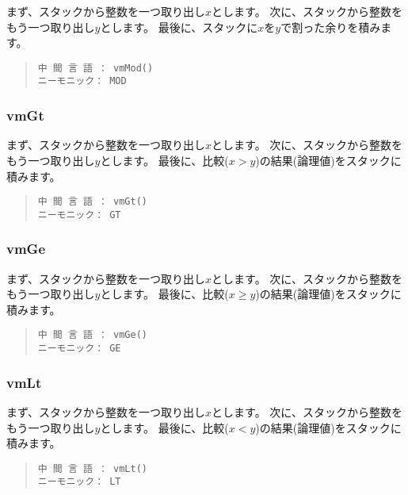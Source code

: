 まず、スタックから整数を一つ取り出し$x$とします。
次に、スタックから整数をもう一つ取り出し$y$とします。
最後に、スタックに$x$を$y$で割った余りを積みます。

\begin{quote}
\begin{verbatim}
中 間 言 語 ： vmMod()
ニーモニック： MOD
\end{verbatim}
\end{quote}

\subsubsection{vmGt}

まず、スタックから整数を一つ取り出し$x$とします。
次に、スタックから整数をもう一つ取り出し$y$とします。
最後に、比較($x > y$)の結果(論理値)をスタックに積みます。

\begin{quote}
\begin{verbatim}
中 間 言 語 ： vmGt()
ニーモニック： GT
\end{verbatim}
\end{quote}

\subsubsection{vmGe}

まず、スタックから整数を一つ取り出し$x$とします。
次に、スタックから整数をもう一つ取り出し$y$とします。
最後に、比較($x \ge y$)の結果(論理値)をスタックに積みます。

\begin{quote}
\begin{verbatim}
中 間 言 語 ： vmGe()
ニーモニック： GE
\end{verbatim}
\end{quote}

\subsubsection{vmLt}

まず、スタックから整数を一つ取り出し$x$とします。
次に、スタックから整数をもう一つ取り出し$y$とします。
最後に、比較($x < y$)の結果(論理値)をスタックに積みます。

\begin{quote}
\begin{verbatim}
中 間 言 語 ： vmLt()
ニーモニック： LT
\end{verbatim}
\end{quote}

